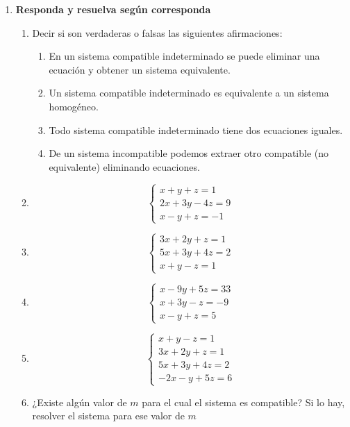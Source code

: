 \documentclass[a4paper,12pt]{article}
\begin{document}
\begin{enumerate}
  \item {\bf{Responda y resuelva según corresponda}} %
    \begin{enumerate}
      \item Decir si son verdaderas o falsas las siguientes afirmaciones:
        \begin{enumerate}
          \item En un sistema compatible indeterminado se puede eliminar una ecuación y obtener un sistema equivalente.
          \item Un sistema compatible indeterminado es equivalente a un sistema homogéneo.
          \item Todo sistema compatible indeterminado tiene dos ecuaciones iguales.
          \item De un sistema incompatible podemos extraer otro compatible (no equivalente) eliminando ecuaciones.
        \end{enumerate}
    \item 
      \[
        \begin{cases}
          x + y + z = 1\\
          2x + 3y - 4z = 9 \\
          x - y + z = -1
        \end{cases}
      \]
    \item
      \[
        \begin{cases}
          3x + 2y + z = 1\\
          5x + 3y + 4z = 2 \\
          x + y - z = 1
        \end{cases}
      \]
    \item 
      \[
        \begin{cases}
          x - 9y + 5z = 33\\
          x + 3y - z = -9\\
          x - y + z = 5
        \end{cases}
      \]
    \item 
      \[
        \begin{cases}
          x + y - z = 1\\
          3x + 2y + z = 1\\
          5x + 3y + 4z = 2\\
          -2x-y+5z = 6
        \end{cases}
      \]
    \item ¿Existe algún valor de $m$ para el cual el sistema es compatible? Si lo hay, resolver el sistema para ese valor de $m$

\end{enumerate}
\end{enumerate}
\end{document}
